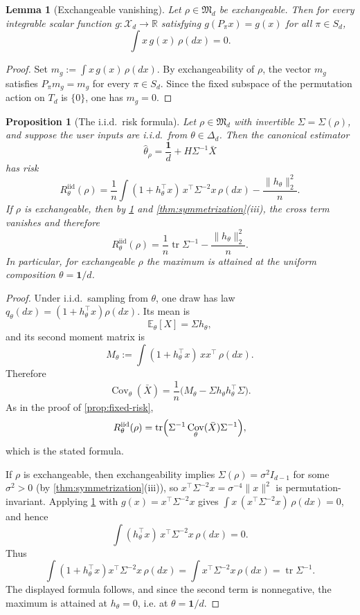 \documentclass[11pt]{amsart}
\newtheorem{proposition}[proposition]{Proposition}
\newtheorem{lemma}[lemma]{Lemma}
\theoremstyle{definition}
\DeclareMathOperator{\tr}{tr}
\DeclareMathOperator{\Cov}{Cov}
\newcommand{\one}{\mathbf 1}
\newcommand{\R}{\mathbb R}
\newcommand{\E}{\mathbb E}
\newcommand{\cX}{\mathcal X}
\newcommand{\fM}{\mathfrak M}
\begin{document}
\begin{lemma}[Exchangeable vanishing]\label{lem:exch-vanish}
Let $\rho\in\fM_d$ be exchangeable. Then for every integrable scalar function $g:\cX_d\to\R$ satisfying $g(P_\pi x)=g(x)$ for all $\pi\in S_d$,
\[
\int x\,g(x)\,\rho(dx)=0.
\]
\end{lemma}

\begin{proof}
Set $m_g:=\int x\,g(x)\,\rho(dx)$. By exchangeability of $\rho$, the vector $m_g$ satisfies $P_\pi m_g=m_g$ for every $\pi\in S_d$. Since the fixed subspace of the permutation action on $T_d$ is $\{0\}$, one has $m_g=0$.
\end{proof}

\begin{proposition}[The i.i.d.\ risk formula]\label{prop:iid-risk}
Let $\rho\in\fM_d$ with invertible $\Sigma=\Sigma(\rho)$, and suppose the user inputs are i.i.d.\ from $\theta\in\Delta_d$. Then the canonical estimator
\[
\widehat\theta_\rho=\frac{\one}{d}+H\Sigma^{-1}\bar X
\]
has risk
\[
R^{\mathrm{iid}}_\theta(\rho)
=\frac1n\int (1+h_\theta^\top x)\,x^\top\Sigma^{-2}x\,\rho(dx)-\frac{\|h_\theta\|_2^2}{n}.
\]
If $\rho$ is exchangeable, then by \cref{lem:exch-vanish} and \cref{thm:symmetrization}(iii), the cross term vanishes and therefore
\[
R^{\mathrm{iid}}_\theta(\rho)=\frac1n\tr\Sigma^{-1}-\frac{\|h_\theta\|_2^2}{n}.
\]
In particular, for exchangeable $\rho$ the maximum is attained at the uniform composition $\theta=\one/d$.
\end{proposition}

\begin{proof}
Under i.i.d.\ sampling from $\theta$, one draw has law $q_\theta(dx)=(1+h_\theta^\top x)\rho(dx)$. Its mean is
\[
\E_\theta[X]=\Sigma h_\theta,
\]
and its second moment matrix is
\[
M_\theta:=\int (1+h_\theta^\top x)\,xx^\top\,\rho(dx).
\]
Therefore
\[
\Cov_\theta(\bar X)=\frac1n\bigl(M_\theta-\Sigma h_\theta h_\theta^\top\Sigma\bigr).
\]
As in the proof of \cref{prop:fixed-risk},
\[
R^{\mathrm{iid}}_\theta(\rho)=\tr\Bigl(\Sigma^{-1}\Cov_\theta(\bar X)\Sigma^{-1}\Bigr),
\]
which is the stated formula.

If $\rho$ is exchangeable, then exchangeability implies $\Sigma(\rho)=\sigma^2 I_{d-1}$ for some $\sigma^2>0$ (by \cref{thm:symmetrization}(iii)), so $x^\top\Sigma^{-2}x=\sigma^{-4}\|x\|^2$ is permutation-invariant. Applying \cref{lem:exch-vanish} with $g(x)=x^\top\Sigma^{-2}x$ gives $\int x\,(x^\top\Sigma^{-2}x)\,\rho(dx)=0$, and hence
\[
\int (h_\theta^\top x)\,x^\top\Sigma^{-2}x\,\rho(dx)=0.
\]
Thus
\[
\int (1+h_\theta^\top x)x^\top\Sigma^{-2}x\,\rho(dx)=\int x^\top\Sigma^{-2}x\,\rho(dx)=\tr\Sigma^{-1}.
\]
The displayed formula follows, and since the second term is nonnegative, the maximum is attained at $h_\theta=0$, i.e. at $\theta=\one/d$.
\end{proof}
\end{document}

